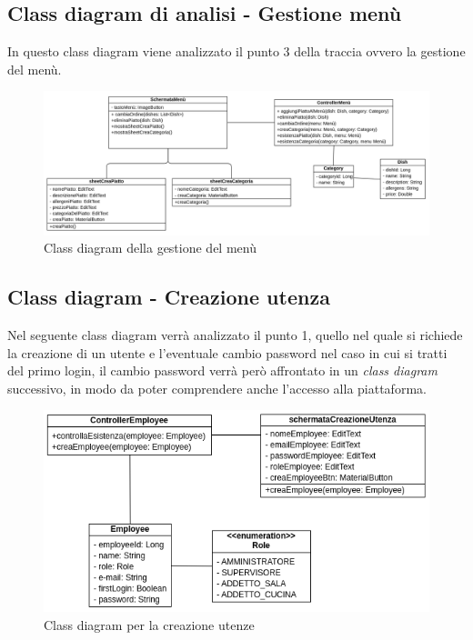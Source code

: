 \subsection{Class diagram di analisi - Gestione menù}
In questo class diagram viene analizzato il punto 3 della traccia ovvero la gestione del menù.
\begin{figure}[H]
  \centering
  \includegraphics[scale=0.55]{img/class_diagrams/gestioneMenu_class_diagram.png}
  \caption{Class diagram della gestione del menù}
\end{figure}
\newpage
\subsection{Class diagram - Creazione utenza}
Nel seguente class diagram verrà analizzato il punto 1, quello nel quale si richiede la creazione di un utente e l'eventuale cambio password nel caso in cui si tratti del primo login, il cambio password verrà però affrontato in un \textit{class diagram} successivo, in modo da poter comprendere anche l'accesso alla piattaforma.

\begin{figure}[H]
  \centering
  \includegraphics[scale=0.75]{img/class_diagrams/creazioneUtenza_class_diagram.png}
  \caption{Class diagram per la creazione utenze}
\end{figure}
